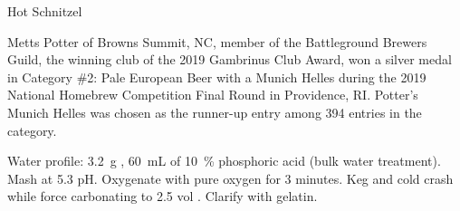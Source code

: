 \stylesection{\stylemunichhelles}

\begin{recipie}{Hot Schnitzel}

\begin{aboutblock}
Metts Potter of Browns Summit, NC, member of the Battleground Brewers Guild, the winning
club of the 2019 Gambrinus Club Award, won a silver medal in Category \#2: Pale European
Beer with a Munich Helles during the 2019 National Homebrew Competition Final Round in
Providence, RI. Potter's Munich Helles was chosen as the runner-up entry among 394 entries
in the category. 
\end{aboutblock}


\begin{methodandtiming}
 
\begin{mashsteps}
\end{mashsteps}

\begin{fermentationsteps}
\end{fermentationsteps}

\begin{directions}
Water profile: 3.2~g , 60~mL of 10~\% phosphoric acid (bulk water treatment).
Mash at 5.3 pH. Oxygenate with pure oxygen for 3 minutes. Keg and cold crash while
force carbonating to 2.5 vol . Clarify with gelatin.
\end{directions}

\end{methodandtiming}

\pagebreak

\begin{ingredientsblock}

\begin{malts}
\end{malts}

\begin{hops}
\end{hops}

\begin{yeasts}
\end{yeasts}

\end{ingredientsblock}

\end{recipie}

